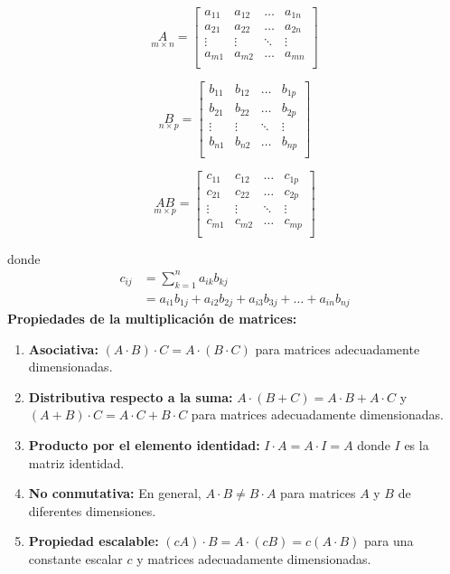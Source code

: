 \begin{}
\begin{minipage}[t]{0.3\textwidth}
\[
\underset{m \times n}{A} =
\begin{bmatrix}
    a_{11} & a_{12} & \dots & a_{1n} \\
    a_{21} & a_{22} & \dots & a_{2n} \\
    \vdots & \vdots & \ddots & \vdots \\
    a_{m1} & a_{m2} & \dots & a_{mn} \\
\end{bmatrix}
\]
\end{minipage}
\hfill
\begin{minipage}[t]{0.3\textwidth}
 \[
\underset{n \times p}{B} =
\begin{bmatrix}
    b_{11} & b_{12} & \dots & b_{1p} \\
    b_{21} & b_{22} & \dots & b_{2p} \\
    \vdots & \vdots & \ddots & \vdots \\
    b_{n1} & b_{n2} & \dots & b_{np} \\
\end{bmatrix}
\]
\end{minipage}
\hfill
\begin{minipage}[t]{0.3\textwidth}
\[
\underset{m \times p}{AB} =
\begin{bmatrix}
    c_{11} & c_{12} & \dots & c_{1p} \\
    c_{21} & c_{22} & \dots & c_{2p} \\
    \vdots & \vdots & \ddots & \vdots \\
    c_{m1} & c_{m2} & \dots & c_{mp} \\
\end{bmatrix}
\]
\end{minipage}

donde 
 $$
\begin{aligned}
c_{ij} & = \sum_{k=1}^{n} a_{ik}b_{kj} \\
       & = a_{i1}b_{1j} + a_{i2}b_{2j} + a_{i3}b_{3j} + \dots + a_{in}b_{nj}
\end{aligned}
$$
\textbf{Propiedades de la multiplicación de matrices:}

\begin{enumerate}
\item \textbf{Asociativa:} $(A \cdot B) \cdot C = A \cdot (B \cdot C)$ para matrices adecuadamente dimensionadas.
\item \textbf{Distributiva respecto a la suma:} $A \cdot (B + C) = A \cdot B + A \cdot C$ y $(A + B) \cdot C = A \cdot C + B \cdot C$ para matrices adecuadamente dimensionadas.
\item \textbf{Producto por el elemento identidad:} $I \cdot A = A \cdot I = A$ donde $I$ es la matriz identidad.
\item \textbf{No conmutativa:} En general, $A \cdot B \neq B \cdot A$ para matrices $A$ y $B$ de diferentes dimensiones.
\item \textbf{Propiedad escalable:} $(cA) \cdot B = A \cdot (cB) = c(A \cdot B)$ para una constante escalar $c$ y matrices adecuadamente dimensionadas.
\end{enumerate}



\end{}
